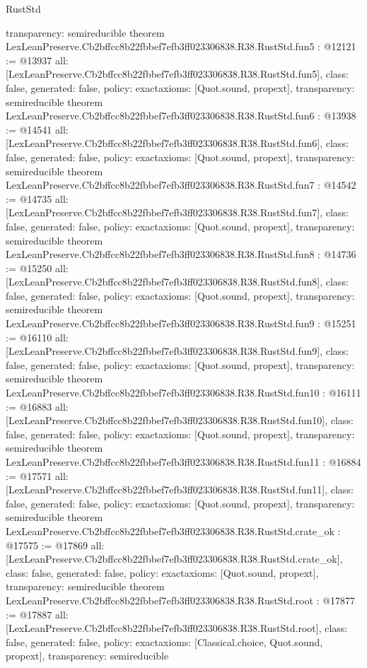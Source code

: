 \begin{lexlean}{RustStd}
\begin{coremodule}
{  transparency: semireducible
}
theorem LexLeanPreserve.Cb2bffcc8b22fbbef7efb3ff023306838.R38.RustStd.fun5 : @12121 := @13937 {
  all: [LexLeanPreserve.Cb2bffcc8b22fbbef7efb3ff023306838.R38.RustStd.fun5],
  class: false,
  generated: false,
  policy: exact{axioms: [Quot.sound, propext]},
  transparency: semireducible
}
theorem LexLeanPreserve.Cb2bffcc8b22fbbef7efb3ff023306838.R38.RustStd.fun6 : @13938 := @14541 {
  all: [LexLeanPreserve.Cb2bffcc8b22fbbef7efb3ff023306838.R38.RustStd.fun6],
  class: false,
  generated: false,
  policy: exact{axioms: [Quot.sound, propext]},
  transparency: semireducible
}
theorem LexLeanPreserve.Cb2bffcc8b22fbbef7efb3ff023306838.R38.RustStd.fun7 : @14542 := @14735 {
  all: [LexLeanPreserve.Cb2bffcc8b22fbbef7efb3ff023306838.R38.RustStd.fun7],
  class: false,
  generated: false,
  policy: exact{axioms: [Quot.sound, propext]},
  transparency: semireducible
}
theorem LexLeanPreserve.Cb2bffcc8b22fbbef7efb3ff023306838.R38.RustStd.fun8 : @14736 := @15250 {
  all: [LexLeanPreserve.Cb2bffcc8b22fbbef7efb3ff023306838.R38.RustStd.fun8],
  class: false,
  generated: false,
  policy: exact{axioms: [Quot.sound, propext]},
  transparency: semireducible
}
theorem LexLeanPreserve.Cb2bffcc8b22fbbef7efb3ff023306838.R38.RustStd.fun9 : @15251 := @16110 {
  all: [LexLeanPreserve.Cb2bffcc8b22fbbef7efb3ff023306838.R38.RustStd.fun9],
  class: false,
  generated: false,
  policy: exact{axioms: [Quot.sound, propext]},
  transparency: semireducible
}
theorem LexLeanPreserve.Cb2bffcc8b22fbbef7efb3ff023306838.R38.RustStd.fun10 : @16111 := @16883 {
  all: [LexLeanPreserve.Cb2bffcc8b22fbbef7efb3ff023306838.R38.RustStd.fun10],
  class: false,
  generated: false,
  policy: exact{axioms: [Quot.sound, propext]},
  transparency: semireducible
}
theorem LexLeanPreserve.Cb2bffcc8b22fbbef7efb3ff023306838.R38.RustStd.fun11 : @16884 := @17571 {
  all: [LexLeanPreserve.Cb2bffcc8b22fbbef7efb3ff023306838.R38.RustStd.fun11],
  class: false,
  generated: false,
  policy: exact{axioms: [Quot.sound, propext]},
  transparency: semireducible
}
theorem LexLeanPreserve.Cb2bffcc8b22fbbef7efb3ff023306838.R38.RustStd.crate_ok : @17575 := @17869 {
  all: [LexLeanPreserve.Cb2bffcc8b22fbbef7efb3ff023306838.R38.RustStd.crate_ok],
  class: false,
  generated: false,
  policy: exact{axioms: [Quot.sound, propext]},
  transparency: semireducible
}
theorem LexLeanPreserve.Cb2bffcc8b22fbbef7efb3ff023306838.R38.RustStd.root : @17877 := @17887 {
  all: [LexLeanPreserve.Cb2bffcc8b22fbbef7efb3ff023306838.R38.RustStd.root],
  class: false,
  generated: false,
  policy: exact{axioms: [Classical.choice, Quot.sound, propext]},
  transparency: semireducible
}


\end{coremodule}
\end{lexlean}
